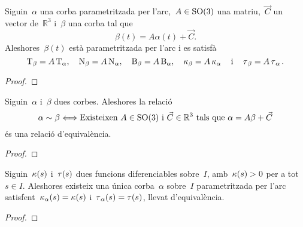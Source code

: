 \documentclass[../geometria-diferencial.tex]{subfiles}
\begin{document}
    \begin{corollary}
        \label{cor:una-corba-parametritzada-per-larc-i-la-seva-imatge-per-una-aplicacio-que-conserva-les-distancies-son-equivalents}
        Siguin~\(\alpha\) una corba parametritzada per l'arc,~\(A\in\operatorname{SO}(3)\) una matriu,~\(\vec{C}\) un vector de~\(\mathbb{R}^{3}\) i~\(\beta\) una corba tal que
        \[
            \beta(t)=A\alpha(t)+\vec{C}.
        \]
        Aleshores~\(\beta(t)\) està parametritzada per l'arc i es satisfà
        \[
            \operatorname{T}_{\beta}=A\operatorname{T}_{\alpha},\quad\operatorname{N}_{\beta}=A\operatorname{N}_{\alpha},\quad\operatorname{B}_{\beta}=A\operatorname{B}_{\alpha},\quad\operatorname{\kappa}_{\beta}=A\operatorname{\kappa}_{\alpha}\quad\text{i}\quad\operatorname{\tau}_{\beta}=A\operatorname{\tau}_{\alpha}.
        \]
    \end{corollary}
    \begin{proof}
    \end{proof}
    \begin{lemma}
        \label{lemma:Teorema-Fonamental-de-la-teoria-local-de-corbes}
        Siguin~\(\alpha\) i~\(\beta\) dues corbes.
        Aleshores la relació
        \[
            \alpha\sim\beta \Longleftrightarrow \text{Existeixen }A\in\operatorname{SO}(3)\text{ i }\vec{C}\in\mathbb{R}^{3}\text{ tals que }\alpha=A\beta+\vec{C}
        \]
        és una relació d'equivalència.
    \end{lemma}
    \begin{proof}
    \end{proof}
    \begin{theorem}
        \label{thm:Teorema-Fonamental-de-la-teoria-local-del-corbes}
        Siguin~\(\operatorname{\kappa}(s)\) i~\(\operatorname{\tau}(s)\) dues funcions diferenciables sobre~\(I\), amb~\(\operatorname{\kappa}(s)>0\) per a tot~\(s\in I\).
        Aleshores existeix una única corba~\(\alpha\) sobre~\(I\) parametritzada per l'arc satisfent~\(\operatorname{\kappa}_{\alpha}(s)=\operatorname{\kappa}(s)\) i~\(\operatorname{\tau}_{\alpha}(s)=\operatorname{\tau}(s)\), llevat d'equivalència.
    \end{theorem}
    \begin{proof}
    \end{proof}
\end{document}
